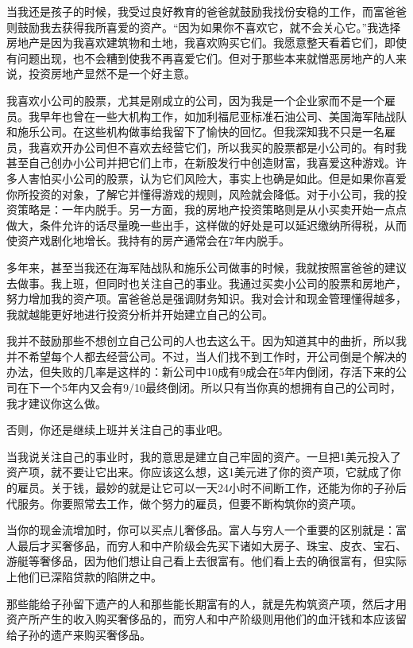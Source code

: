 当我还是孩子的时候，我受过良好教育的爸爸就鼓励我找份安稳的工作，而富爸爸则鼓励我去获得我所喜爱的资产。“因为如果你不喜欢它，就不会关心它。”我选择房地产是因为我喜欢建筑物和土地，我喜欢购买它们。我愿意整天看着它们，即使有问题出现，也不会糟到使我不再喜爱它们。但对于那些本来就憎恶房地产的人来说，投资房地产显然不是一个好主意。

我喜欢小公司的股票，尤其是刚成立的公司，因为我是一个企业家而不是一个雇员。我早年也曾在一些大机构工作，如加利福尼亚标准石油公司、美国海军陆战队和施乐公司。在这些机构做事给我留下了愉快的回忆。但我深知我不只是一名雇员，我喜欢开办公司但不喜欢去经营它们，所以我买的股票都是小公司的。有时我甚至自己创办小公司并把它们上市，在新股发行中创造财富，我喜爱这种游戏。许多人害怕买小公司的股票，认为它们风险大，事实上也确是如此。但是如果你喜爱你所投资的对象，了解它并懂得游戏的规则，风险就会降低。对于小公司，我的投资策略是：一年内脱手。另一方面，我的房地产投资策略则是从小买卖开始一点点做大，条件允许的话尽量晚一些出手，这样做的好处是可以延迟缴纳所得税，从而使资产戏剧化地增长。我持有的房产通常会在7年内脱手。

多年来，甚至当我还在海军陆战队和施乐公司做事的时候，我就按照富爸爸的建议去做事。我上班，但同时也关注自己的事业。我通过买卖小公司的股票和房地产，努力增加我的资产项。富爸爸总是强调财务知识。我对会计和现金管理懂得越多，我就越能更好地进行投资分析并开始建立自己的公司。

我并不鼓励那些不想创立自己公司的人也去这么干。因为知道其中的曲折，所以我并不希望每个人都去经营公司。不过，当人们找不到工作时，开公司倒是个解决的办法，但失败的几率是这样的：新公司中10成有9成会在5年内倒闭，存活下来的公司在下一个5年内又会有9/10最终倒闭。所以只有当你真的想拥有自己的公司时，我才建议你这么做。

否则，你还是继续上班并关注自己的事业吧。

当我说关注自己的事业时，我的意思是建立自己牢固的资产。一旦把1美元投入了资产项，就不要让它出来。你应该这么想，这1美元进了你的资产项，它就成了你的雇员。关于钱，最妙的就是让它可以一天24小时不间断工作，还能为你的子孙后代服务。你要照常去工作，做个努力的雇员，但要不断构筑你的资产项。

当你的现金流增加时，你可以买点儿奢侈品。富人与穷人一个重要的区别就是：富人最后才买奢侈品，而穷人和中产阶级会先买下诸如大房子、珠宝、皮衣、宝石、游艇等奢侈品，因为他们想让自己看上去很富有。他们看上去的确很富有，但实际上他们已深陷贷款的陷阱之中。

那些能给子孙留下遗产的人和那些能长期富有的人，就是先构筑资产项，然后才用资产所产生的收入购买奢侈品的，而穷人和中产阶级则用他们的血汗钱和本应该留给子孙的遗产来购买奢侈品。


